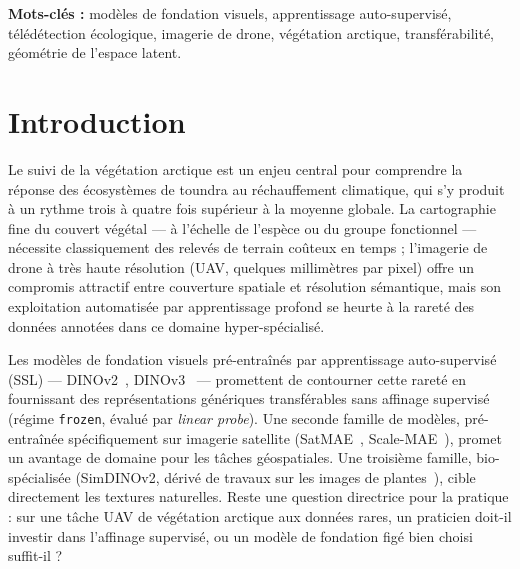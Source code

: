 \documentclass[11pt,a4paper]{article}
\newcommand{\frz}{\texttt{frozen}}
\newcommand{\lp}{\emph{linear probe}}
\begin{document}
\vspace{0.5em}
\noindent\textbf{Mots-clés :} modèles de fondation visuels, apprentissage auto-supervisé, télédétection écologique, imagerie de drone, végétation arctique, transférabilité, géométrie de l'espace latent.

\tableofcontents
\newpage

\section{Introduction}
\label{sec:intro}

Le suivi de la végétation arctique est un enjeu central pour comprendre la réponse des écosystèmes de toundra au réchauffement climatique, qui s'y produit à un rythme trois à quatre fois supérieur à la moyenne globale. La cartographie fine du couvert végétal — à l'échelle de l'espèce ou du groupe fonctionnel — nécessite classiquement des relevés de terrain coûteux en temps ; l'imagerie de drone à très haute résolution (UAV, quelques millimètres par pixel) offre un compromis attractif entre couverture spatiale et résolution sémantique, mais son exploitation automatisée par apprentissage profond se heurte à la rareté des données annotées dans ce domaine hyper-spécialisé.

Les modèles de fondation visuels pré-entraînés par apprentissage auto-supervisé (SSL) — DINOv2~\autocite{oquab2023dinov2}, DINOv3~\autocite{darcet2024dinov3} — promettent de contourner cette rareté en fournissant des représentations génériques transférables sans affinage supervisé (régime \frz{}, évalué par \lp{}). Une seconde famille de modèles, pré-entraînée spécifiquement sur imagerie satellite (SatMAE~\autocite{cong2022satmae}, Scale-MAE~\autocite{reed2023scalemae}), promet un avantage de domaine pour les tâches géospatiales. Une troisième famille, bio-spécialisée (SimDINOv2, dérivé de travaux sur les images de plantes~\autocite{moummad2026selfsupervised}), cible directement les textures naturelles. Reste une question directrice pour la pratique : sur une tâche UAV de végétation arctique aux données rares, un praticien doit-il investir dans l'affinage supervisé, ou un modèle de fondation figé bien choisi suffit-il ?
\end{document}
